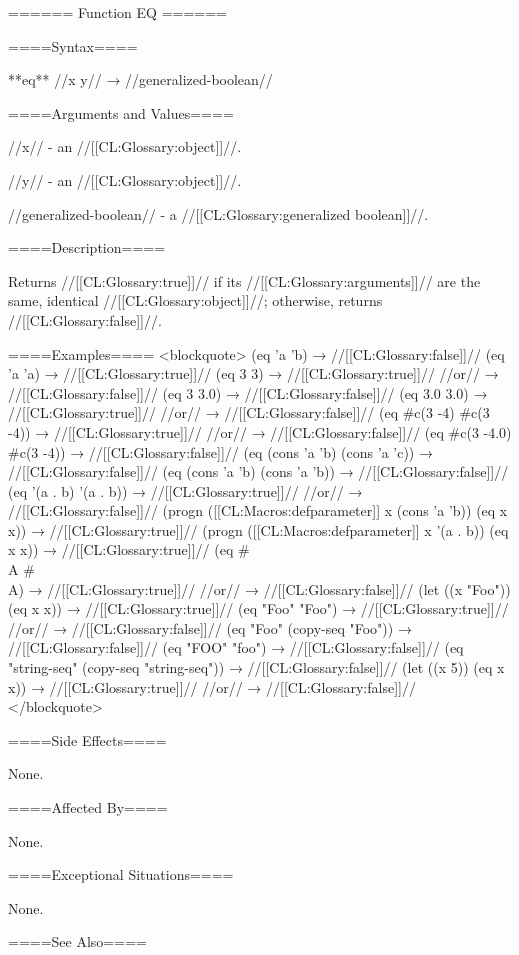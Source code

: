 ====== Function EQ ======

====Syntax====

**eq** //x y// → //generalized-boolean//

====Arguments and Values====

//x// - an //[[CL:Glossary:object]]//.

//y// - an //[[CL:Glossary:object]]//.

//generalized-boolean// - a //[[CL:Glossary:generalized boolean]]//.

====Description====

Returns //[[CL:Glossary:true]]// if its //[[CL:Glossary:arguments]]// are the same, identical //[[CL:Glossary:object]]//; otherwise, returns //[[CL:Glossary:false]]//.

====Examples==== <blockquote> (eq 'a 'b) → //[[CL:Glossary:false]]// (eq 'a 'a) → //[[CL:Glossary:true]]// (eq 3 3) → //[[CL:Glossary:true]]// //or// → //[[CL:Glossary:false]]// (eq 3 3.0) → //[[CL:Glossary:false]]// (eq 3.0 3.0) → //[[CL:Glossary:true]]// //or// → //[[CL:Glossary:false]]// (eq #c(3 -4) #c(3 -4)) → //[[CL:Glossary:true]]// //or// → //[[CL:Glossary:false]]// (eq #c(3 -4.0) #c(3 -4)) → //[[CL:Glossary:false]]// (eq (cons 'a 'b) (cons 'a 'c)) → //[[CL:Glossary:false]]// (eq (cons 'a 'b) (cons 'a 'b)) → //[[CL:Glossary:false]]// (eq '(a . b) '(a . b)) → //[[CL:Glossary:true]]// //or// → //[[CL:Glossary:false]]// (progn ([[CL:Macros:defparameter]] x (cons 'a 'b)) (eq x x)) → //[[CL:Glossary:true]]// (progn ([[CL:Macros:defparameter]] x '(a . b)) (eq x x)) → //[[CL:Glossary:true]]// (eq #\\A #\\A) → //[[CL:Glossary:true]]// //or// → //[[CL:Glossary:false]]// (let ((x "Foo")) (eq x x)) → //[[CL:Glossary:true]]// (eq "Foo" "Foo") → //[[CL:Glossary:true]]// //or// → //[[CL:Glossary:false]]// (eq "Foo" (copy-seq "Foo")) → //[[CL:Glossary:false]]// (eq "FOO" "foo") → //[[CL:Glossary:false]]// (eq "string-seq" (copy-seq "string-seq")) → //[[CL:Glossary:false]]// (let ((x 5)) (eq x x)) → //[[CL:Glossary:true]]// //or// → //[[CL:Glossary:false]]// </blockquote>

====Side Effects====

None.

====Affected By====

None.

====Exceptional Situations====

None.

====See Also====


